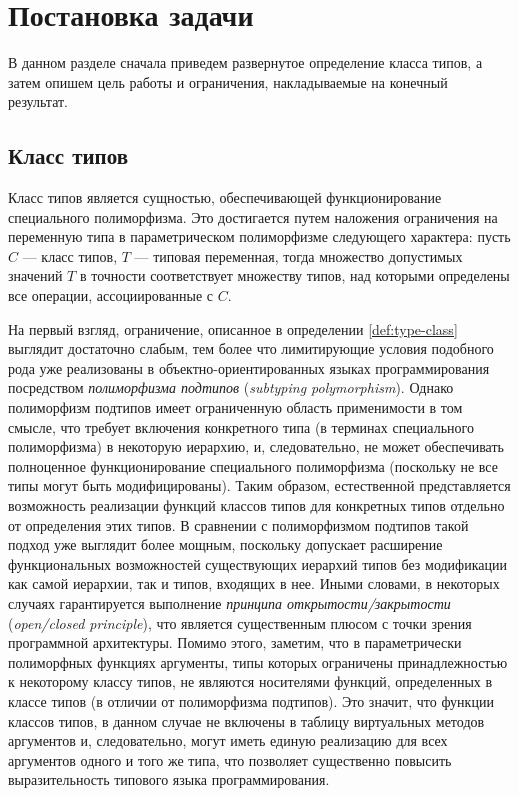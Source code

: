 \chapter{Постановка задачи}

В данном разделе сначала приведем развернутое определение класса типов, а затем опишем цель работы и ограничения, накладываемые на конечный результат.

\section{Класс типов}

\begin{definition}
Класс типов является сущностью, обеспечивающей функционирование специального полиморфизма. Это достигается путем наложения ограничения на переменную типа в параметрическом полиморфизме следующего характера: пусть $C$ --- класс типов, $T$ --- типовая переменная, тогда множество допустимых значений $T$ в точности соответствует множеству типов, над которыми определены все операции, ассоциированные с $C$.  
\end{definition}

На первый взгляд, ограничение, описанное в определении \ref{def:type-class} выглядит достаточно слабым, тем более что лимитирующие условия подобного рода уже реализованы в объектно-ориентированных языках программирования посредством \emph{полиморфизма подтипов} (\emph{subtyping polymorphism}). Однако полиморфизм подтипов имеет ограниченную область применимости в том смысле, что требует включения конкретного типа (в терминах специального полиморфизма) в некоторую иерархию, и, следовательно, не может обеспечивать полноценное функционирование специального полиморфизма (поскольку не все типы могут быть модифицированы). Таким образом, естественной представляется возможность реализации функций классов типов для конкретных типов отдельно от определения этих типов. В сравнении с полиморфизмом подтипов такой подход уже выглядит более мощным, поскольку допускает расширение функциональных возможностей существующих иерархий типов без модификации как самой иерархии, так и типов, входящих в нее. Иными словами, в некоторых случаях гарантируется выполнение \emph{принципа открытости/закрытости} (\emph{open/closed principle}), что является существенным плюсом с точки зрения программной архитектуры. Помимо этого, заметим, что в параметрически полиморфных функциях аргументы, типы которых ограничены принадлежностью к некоторому классу типов, не являются носителями функций, определенных в классе типов (в отличии от полиморфизма подтипов). Это значит, что функции классов типов, в данном случае не включены в таблицу виртуальных методов аргументов и, следовательно, могут иметь единую реализацию для всех аргументов одного и того же типа, что позволяет существенно повысить выразительность типового языка программирования.

